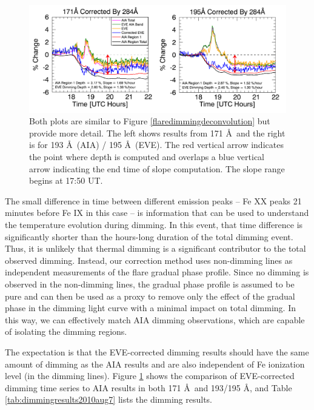 \begin{figure}[!h]
    \begin{center}
	    \includegraphics[width=166mm]{Images/EVECorrectionResults2010Aug7.png}
    \end{center}
    \caption[Dimming parameterization for 2010 August 7 event]{
        Both plots are similar to Figure \ref{flaredimmingdeconvolution} but provide more detail. The left shows results 
        from 171 \AA\ and the right is for 193 \AA\ (AIA) / 195 \AA\ (EVE). The red vertical arrow indicates the point 
        where depth is computed and overlaps a blue vertical arrow indicating the end time of slope computation. 
        The slope range begins at 17:50 UT. 
   	}
    \label{fig:parameterization2010aug7}
\end{figure}

The small difference in time between different emission peaks -- Fe XX peaks 21 minutes before Fe IX in this case -- is information that can be used to understand the temperature evolution during dimming. In this event, that time difference is significantly shorter than the hours-long duration of the total dimming event. Thus, it is unlikely that thermal dimming is a significant contributor to the total observed dimming. Instead, our correction method uses non-dimming lines as independent measurements of the flare gradual phase profile. Since no dimming is observed in the non-dimming lines, the gradual phase profile is assumed to be pure and can then be used as a proxy to remove only the effect of the gradual phase in the dimming light curve with a minimal impact on total dimming. In this way, we can effectively match AIA dimming observations, which are capable of isolating the dimming regions.

The expectation is that the EVE-corrected dimming results should have the same amount of dimming as the AIA results and are also independent of Fe ionization level (in the dimming lines). Figure \ref{fig:parameterization2010aug7} shows the comparison of EVE-corrected dimming time series to AIA results in both 171 \AA\ and 193/195 \AA, and Table \ref{tab:dimmingresults2010aug7} lists the dimming results. 

